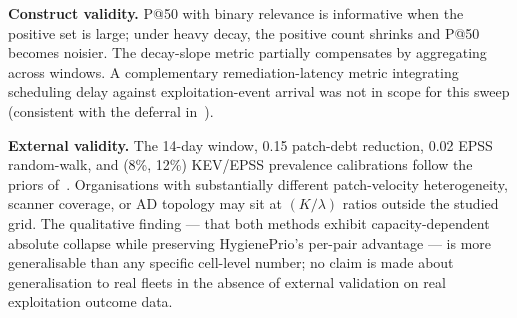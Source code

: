 \textbf{Construct validity.} P@50 with binary relevance is informative
when the positive set is large; under heavy decay, the positive count
shrinks and P@50 becomes noisier. The decay-slope metric partially
compensates by aggregating across windows. A complementary
remediation-latency metric integrating scheduling delay against
exploitation-event arrival was not in scope for this sweep
(consistent with the deferral in~\cite{paper5temporal}).

\textbf{External validity.} The 14-day window, 0.15 patch-debt
reduction, 0.02 EPSS random-walk, and (8\%, 12\%) KEV/EPSS prevalence
calibrations follow the priors of~\cite{paper4hygieneprio,paper5temporal}. Organisations with
substantially different patch-velocity heterogeneity, scanner coverage,
or AD topology may sit at $(K/\lambda)$ ratios outside the studied
grid. The qualitative finding --- that both methods exhibit
capacity-dependent absolute collapse while preserving HygienePrio's
per-pair advantage --- is more generalisable than any specific cell-level
number; no claim is made about generalisation to real fleets in the
absence of external validation on real exploitation outcome data.
